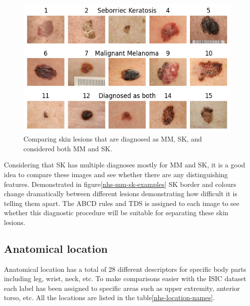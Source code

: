 \begin{figure}
	\centering
	\includegraphics[scale=0.75]{images/nhs/nhs-mm-sk-examples.png}
	\caption{Comparing skin lesions that are diagnosed as MM, SK, and considered both MM and SK.}
\end{figure}\label{nhs-mm-sk-examples}

Considering that SK has multiple diagnoses mostly for MM and SK, it is a good idea to compare these images and see whether there are any distinguishing features. Demonstrated in figure\ref{nhs-mm-sk-examples} SK border and colours change dramatically between different lesions demonstrating how difficult it is telling them apart\cite{}. The ABCD rules and TDS is assigned to each image to see whether this diagnostic procedure will be suitable for separating these skin lesions.

\subsection{Anatomical location}

Anatomical location has a total of 28 different descriptors for specific body parts including leg, wrist, neck, etc. To make comparisons easier with the ISIC dataset each label has been assigned to specific areas such as upper extremity, anterior torso, etc. All the locations are listed in the table\ref{nhs-location-names}.


